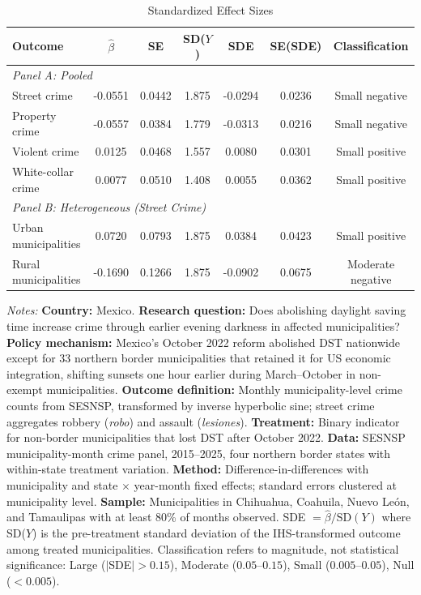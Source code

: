 \begin{table}[htbp]
\centering
\caption{Standardized Effect Sizes}
\label{tab:sde}
\begin{threeparttable}
\begin{tabular}{lcccccc}
\toprule
Outcome & $\hat{\beta}$ & SE & SD($Y$) & SDE & SE(SDE) & Classification \\
\midrule
\multicolumn{7}{l}{\textit{Panel A: Pooled}} \\[3pt]
Street crime & -0.0551 & 0.0442 & 1.875 & -0.0294 & 0.0236 & Small negative \\
Property crime & -0.0557 & 0.0384 & 1.779 & -0.0313 & 0.0216 & Small negative \\
Violent crime & 0.0125 & 0.0468 & 1.557 & 0.0080 & 0.0301 & Small positive \\
White-collar crime & 0.0077 & 0.0510 & 1.408 & 0.0055 & 0.0362 & Small positive \\
\midrule
\multicolumn{7}{l}{\textit{Panel B: Heterogeneous (Street Crime)}} \\[3pt]
Urban municipalities & 0.0720 & 0.0793 & 1.875 & 0.0384 & 0.0423 & Small positive \\
Rural municipalities & -0.1690 & 0.1266 & 1.875 & -0.0902 & 0.0675 & Moderate negative \\
\bottomrule
\end{tabular}
\begin{tablenotes}[flushleft]\small
\item \textit{Notes:} \textbf{Country:} Mexico. \textbf{Research question:} Does abolishing daylight saving time increase crime through earlier evening darkness in affected municipalities? \textbf{Policy mechanism:} Mexico's October 2022 reform abolished DST nationwide except for 33 northern border municipalities that retained it for US economic integration, shifting sunsets one hour earlier during March--October in non-exempt municipalities. \textbf{Outcome definition:} Monthly municipality-level crime counts from SESNSP, transformed by inverse hyperbolic sine; street crime aggregates robbery (\textit{robo}) and assault (\textit{lesiones}). \textbf{Treatment:} Binary indicator for non-border municipalities that lost DST after October 2022. \textbf{Data:} SESNSP municipality-month crime panel, 2015--2025, four northern border states with within-state treatment variation. \textbf{Method:} Difference-in-differences with municipality and state $\times$ year-month fixed effects; standard errors clustered at municipality level. \textbf{Sample:} Municipalities in Chihuahua, Coahuila, Nuevo Le\'on, and Tamaulipas with at least 80\% of months observed. SDE $= \hat{\beta} / \text{SD}(Y)$ where SD($Y$) is the pre-treatment standard deviation of the IHS-transformed outcome among treated municipalities. Classification refers to magnitude, not statistical significance: Large ($|$SDE$| > 0.15$), Moderate ($0.05$--$0.15$), Small ($0.005$--$0.05$), Null ($< 0.005$).
\end{tablenotes}
\end{threeparttable}
\end{table}
